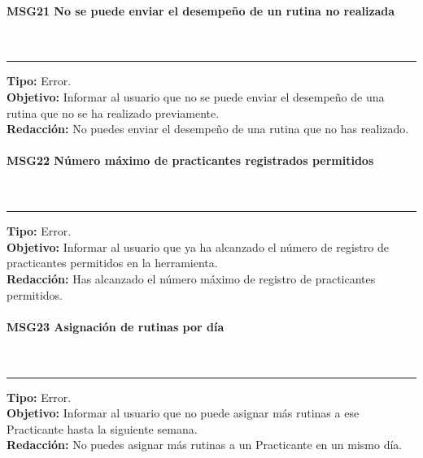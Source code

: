 \paragraph{\textcolor[rgb]{0, 0, 0.545098}{MSG21 No se puede enviar el desempeño de un rutina no realizada}} \hspace{1cm} \\
\label{msj:MSG21}
\rule[3mm]{16.59cm}{0.1mm} \vspace{1mm}
\textbf{Tipo:} Error.\\
\textbf{Objetivo:} Informar al usuario que no se puede enviar el desempeño de una rutina que no se ha realizado previamente.\\
\textbf{Redacción:} No puedes enviar el desempeño de una rutina que no has realizado.\\

\paragraph{\textcolor[rgb]{0, 0, 0.545098}{MSG22 Número máximo de practicantes registrados permitidos}} \hspace{1cm} \\
\label{msj:MSG22}
\rule[3mm]{16.59cm}{0.1mm} \vspace{1mm}
\textbf{Tipo:} Error.\\
\textbf{Objetivo:} Informar al usuario que ya ha alcanzado el número de registro de practicantes permitidos en la herramienta.\\
\textbf{Redacción:} Has alcanzado el número máximo de registro de practicantes permitidos.\\

\paragraph{\textcolor[rgb]{0, 0, 0.545098}{MSG23 Asignación de rutinas por día}} \hspace{1cm} \\
\label{msj:MSG23}
\rule[3mm]{16.59cm}{0.1mm} \vspace{1mm}
\textbf{Tipo:} Error.\\
\textbf{Objetivo:}  Informar al usuario que no puede asignar más rutinas a ese Practicante hasta la siguiente semana.\\
\textbf{Redacción:} No puedes asignar más rutinas a un Practicante en un mismo día.\\

